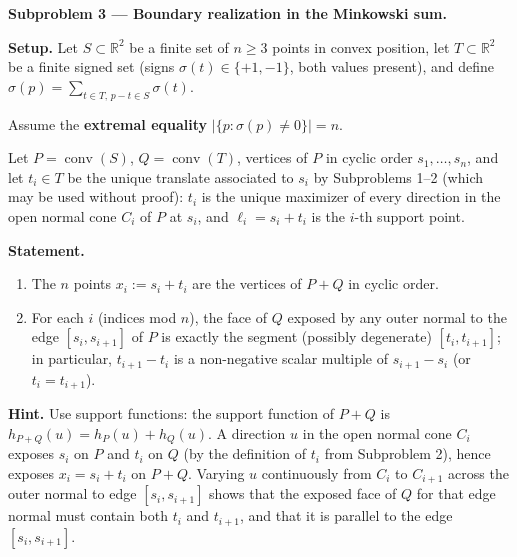 \documentclass{article}
\begin{document}
\textbf{Subproblem 3 --- Boundary realization in the Minkowski sum.}

\medskip
\textbf{Setup.}
Let $S\subset\mathbb{R}^2$ be a finite set of $n\ge 3$ points in convex position,
let $T\subset\mathbb{R}^2$ be a finite signed set (signs $\sigma(t)\in\{+1,-1\}$,
both values present), and define $\sigma(p)=\sum_{t\in T,\,p-t\in S}\sigma(t)$.

Assume the \textbf{extremal equality} $|\{p:\sigma(p)\neq 0\}|=n$.

Let $P=\operatorname{conv}(S)$, $Q=\operatorname{conv}(T)$, vertices of $P$ in cyclic order
$s_1,\dots,s_n$, and let $t_i\in T$ be the unique translate associated to $s_i$ by
Subproblems 1--2 (which may be used without proof): $t_i$ is the unique maximizer of
every direction in the open normal cone $C_i$ of $P$ at $s_i$, and $\ell_i=s_i+t_i$
is the $i$-th support point.

\medskip
\textbf{Statement.}
\begin{enumerate}
  \item The $n$ points $x_i:=s_i+t_i$ are the vertices of $P+Q$ in cyclic order.
  \item For each $i$ (indices mod $n$), the face of $Q$ exposed by any outer normal to the
        edge $[s_i,s_{i+1}]$ of $P$ is exactly the segment (possibly degenerate) $[t_i,t_{i+1}]$;
        in particular, $t_{i+1}-t_i$ is a non-negative scalar multiple of $s_{i+1}-s_i$
        (or $t_i=t_{i+1}$).
\end{enumerate}

\medskip
\textbf{Hint.}
Use support functions: the support function of $P+Q$ is $h_{P+Q}(u)=h_P(u)+h_Q(u)$.
A direction $u$ in the open normal cone $C_i$ exposes $s_i$ on $P$ and $t_i$ on $Q$
(by the definition of $t_i$ from Subproblem 2), hence exposes $x_i=s_i+t_i$ on $P+Q$.
Varying $u$ continuously from $C_i$ to $C_{i+1}$ across the outer normal to edge
$[s_i,s_{i+1}]$ shows that the exposed face of $Q$ for that edge normal must contain
both $t_i$ and $t_{i+1}$, and that it is parallel to the edge $[s_i,s_{i+1}]$.
\end{document}
